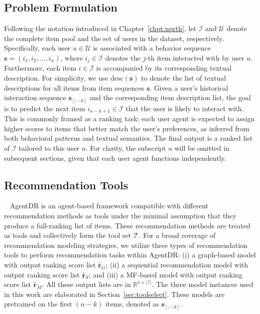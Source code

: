 \subsection{Problem Formulation}
Following the notation introduced in Chapter~\ref{chpt:uprth}, let $\mathcal{I}$ and $\mathcal{U}$ denote the complete item pool and the set of users in the dataset, respectively. Specifically, each user $u \in \mathcal{U}$ is associated with a behavior sequence $\mathbf{s} = (i_1, i_2, \dots, i_n)$, where $i_j \in \mathcal{I}$ denotes the $j$-th item interacted with by user $u$. Furthermore, each item $i \in \mathcal{I}$ is accompanied by its corresponding textual description. For simplicity, we use $\text{desc}(\mathbf{s})$ to denote the list of textual descriptions for all items from item sequences $\mathbf{s}$.
Given a user's historical interaction sequence $\mathbf{s}_{[:-k]}$ and the corresponding item description list, the goal is to predict the next item $i_{n-k+1} \in \mathcal{I}$ that the user is likely to interact with.
This is commonly framed as a ranking task: each user agent is expected to assign higher scores to items that better match the user's preferences, as inferred from both behavioral patterns and textual semantics. The final output is a ranked list of $\mathcal{I}$ tailored to this user $u$. For clarity, the subscript $u$ will be omitted in subsequent sections, given that each user agent functions independently.

\subsection{Recommendation Tools}~\label{sec:rectools}
AgentDR is an agent-based framework compatible with different recommendation methods as tools under the minimal assumption that they produce a full-ranking list of items. These recommendation methods are treated as tools and collectively form the tool set $\mathcal{T}$. For a broad coverage of recommendation modeling strategies, we utilize three types of recommendation tools to perform recommendation tasks within AgentDR: (i) a graph-based model with output ranking score list $\hat{\mathbf{r}}_{G}$; (ii) a sequential recommendation model with output ranking score list $\hat{\mathbf{r}}_{S}$; and (iii) a MF-based model with output ranking score list $\hat{\mathbf{r}}_{M}$. All these output lists are in $\mathbb{R}^{1\times|\mathcal{I}|}$. The three model instances used in this work are elaborated in Section~\ref{sec:toolselect}. These models are pretrained on the first $(n-k)$ items, denoted as $\mathbf{s}_{[:-k]}$.

